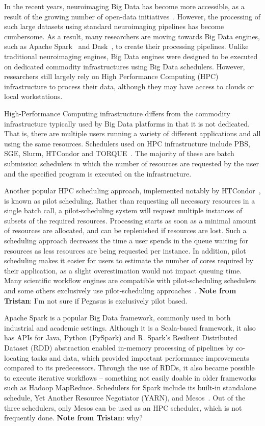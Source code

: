 \documentclass{IEEEtran}
\newcommand{\tristan}[1]{\color{red}\textbf{Note from Tristan}:
      #1 \color{black}}
\newcommand{\todo}[1]{\marginpar{\parbox{18mm}{\flushleft\tiny\color{red}\textbf{TODO}:
      #1}}}
\begin{document}
In the recent years, neuroimaging Big Data has become more accessible, as a
result of the growing number of open-data initiatives~\cite{openneuro, hcp, ukbiobank}. However, the
processing of such large datasets using standard neuroimaging pipelines has 
become cumbersome. As a result, many researchers are moving towards Big Data 
engines, such as Apache Spark~\cite{spark} and Dask~\cite{sdask}, to 
create their processing pipelines. Unlike traditional neuroimaging 
engines, Big Data engines were designed to be executed on dedicated 
commodity infrastructures using Big Data schedulers. However, 
researchers still largely rely on High Performance Computing (HPC) 
infrastructure to process their data, although they may have access to 
clouds or local workstations.

High-Performance Computing infrastructure differs from the commodity infrastructure 
typically used by Big Data platforms in that it is not dedicated. That is, there 
are multiple users running a variety of different applications and all using the 
same resources. Schedulers used on HPC infrastructure include PBS, SGE, Slurm, HTCondor and 
TORQUE~\cite{schedulers}. The majority of these are batch submission schedulers
in which the number of resources are requested by the user and the specified 
program is executed on the infrastructure.

Another popular HPC scheduling approach,
implemented notably by HTCondor~\cite{htcondor}, is known as pilot scheduling. Rather than requesting
all necessary resources in a single batch call, a pilot-scheduling system will request
multiple instances of subsets of the required resources. Processing starts 
as soon as a minimal amount of resources are allocated, and can be replenished if 
resources are lost. Such a scheduling approach decreases the time a 
user spends in the queue waiting for resources as less resources are 
being requested per instance.\todo{need citation} In addition, pilot 
scheduling makes it easier for users to estimate the number of 
cores required by their application, as a slight overestimation would not impact queuing 
time. Many scientific workflow engines are compatible with 
pilot-scheduling schedulers~\cite{nipype and others} and some others 
exclusively use pilot-scheduling approaches~\cite{Pegasus and PSOM}. 
\tristan{I'm not sure if Pegasus is exclusively pilot based.}

Apache Spark is a popular Big Data framework, commonly used in both industrial
and academic settings. Although it is a Scala-based framework, it also has APIs
for Java, Python (PySpark) and R. Spark's Resilient Distributed Dataset (RDD) abstraction enabled
in-memory processing of pipelines by co-locating tasks and data, which provided important performance improvements compared to its predecessors.
 Through the use of RDDs, it also became possible to execute iterative 
workflows -- something not easily doable in older frameworks such as Hadoop MapReduce.
Schedulers for Spark include its built-in standalone schedule, Yet Another Resource Negotiator (YARN),
and Mesos~\cite{yarn, mesos}. Out of the three schedulers, only Mesos can be used
as an HPC scheduler, which is not frequently done. \tristan{why?}
\end{document}
